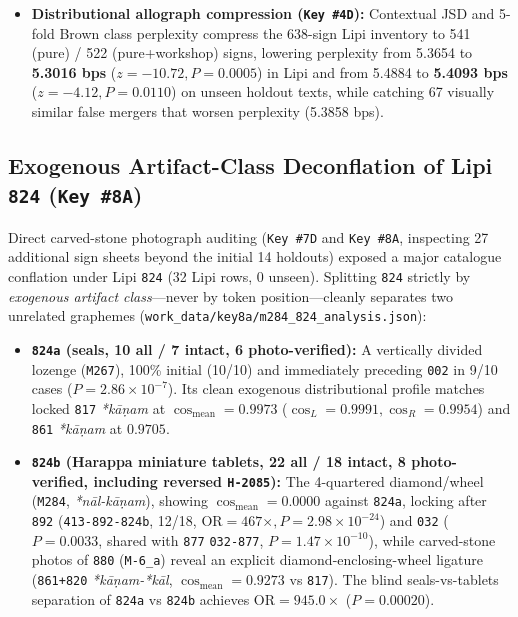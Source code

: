 \documentclass[11pt,a4paper]{article}
\begin{document}
\begin{itemize}
  \item \textbf{Distributional allograph compression (\texttt{Key \#4D}):} Contextual JSD and 5-fold Brown class perplexity \citep{brown1992} compress the 638-sign Lipi inventory to 541 (pure) / 522 (pure+workshop) signs, lowering perplexity from 5.3654 to \textbf{5.3016 bps} ($z = -10.72, P = 0.0005$) in Lipi and from 5.4884 to \textbf{5.4093 bps} ($z = -4.12, P = 0.0110$) on unseen holdout texts, while catching 67 visually similar false mergers that worsen perplexity (5.3858 bps).
\end{itemize}

\subsection{Exogenous Artifact-Class Deconflation of Lipi \texttt{824} (\texttt{Key \#8A})}

Direct carved-stone photograph auditing (\texttt{Key \#7D} and \texttt{Key \#8A}, inspecting 27 additional sign sheets beyond the initial 14 holdouts) exposed a major catalogue conflation under Lipi \texttt{824} (32 Lipi rows, 0 unseen). Splitting \texttt{824} strictly by \textit{exogenous artifact class}—never by token position—cleanly separates two unrelated graphemes (\texttt{work\_data/key8a/m284\_824\_analysis.json}):
\begin{itemize}
  \item \textbf{\texttt{824a} (seals, 10 all / 7 intact, 6 photo-verified):} A vertically divided lozenge (\texttt{M267}), 100\% initial (10/10) and immediately preceding \texttt{002} in 9/10 cases ($P = 2.86 \times 10^{-7}$). Its clean exogenous distributional profile matches locked \texttt{817} \textit{*kāṇam} at $\cos_{\text{mean}} = \mathbf{0.9973}$ ($\cos_L = 0.9991, \cos_R = 0.9954$) and \texttt{861} \textit{*kāṇam} at $\mathbf{0.9705}$.
  \item \textbf{\texttt{824b} (Harappa miniature tablets, 22 all / 18 intact, 8 photo-verified, including reversed \texttt{H-2085}):} The 4-quartered diamond/wheel (\texttt{M284}, \textit{*nāl-kāṇam}), showing $\cos_{\text{mean}} = \mathbf{0.0000}$ against \texttt{824a}, locking after \texttt{892} (\texttt{413-892-824b}, 12/18, $\text{OR} = 467\times, P = 2.98 \times 10^{-24}$) and \texttt{032} ($P = 0.0033$, shared with \texttt{877} \texttt{032-877}, $P = 1.47 \times 10^{-10}$), while carved-stone photos of \texttt{880} (\texttt{M-6\_a}) reveal an explicit diamond-enclosing-wheel ligature (\texttt{861+820} \textit{*kāṇam-*kāl}, $\cos_{\text{mean}} = 0.9273$ vs \texttt{817}). The blind seals-vs-tablets separation of \texttt{824a} vs \texttt{824b} achieves $\text{OR} = \mathbf{945.0\times}$ ($P = 0.00020$).
\end{itemize}
\end{document}
